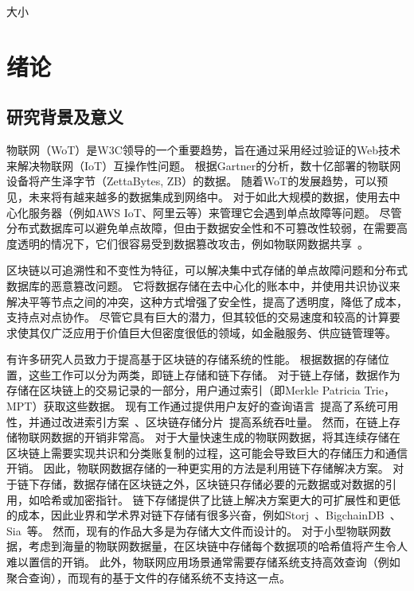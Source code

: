 
大小

\chapter{绪论}
\section{研究背景及意义}
物联网（WoT）是W3C领导的一个重要趋势，旨在通过采用经过验证的Web技术来解决物联网（IoT）互操作性问题。
根据Gartner的分析，数十亿部署的物联网设备将产生泽字节（ZettaBytes, ZB）的数据。
随着WoT的发展趋势，可以预见，未来将有越来越多的数据集成到网络中。
对于如此大规模的数据，使用去中心化服务器（例如AWS IoT、阿里云等）来管理它会遇到单点故障等问题。
尽管分布式数据库可以避免单点故障，但由于数据安全性和不可篡改性较弱，在需要高度透明的情况下，它们很容易受到数据篡改攻击，例如物联网数据共享~\cite{chen2022blockchain}。

区块链以可追溯性和不变性为特征，可以解决集中式存储的单点故障问题和分布式数据库的恶意篡改问题。
它将数据存储在去中心化的账本中，并使用共识协议来解决平等节点之间的冲突，这种方式增强了安全性，提高了透明度，降低了成本，支持点对点协作。
尽管它具有巨大的潜力，但其较低的交易速度和较高的计算要求使其仅广泛应用于价值巨大但密度很低的领域，如金融服务、供应链管理等。

有许多研究人员致力于提高基于区块链的存储系统的性能。
根据数据的存储位置，这些工作可以分为两类，即链上存储和链下存储。
对于链上存储，数据作为存储在区块链上的交易记录的一部分，用户通过索引（即Merkle Patricia Trie，MPT）获取这些数据。
现有工作通过提供用户友好的查询语言~\cite{zhu2019sebdb,xu2019vchain,wang2022vchain+}提高了系统可用性，并通过改进索引方案~\cite{li2023lvmt,zhang2024cole}、区块链存储分片~\cite{zamani2018rapidchain,hong2023gridb,el2019blockchaindb}提高系统吞吐量。
然而，在链上存储物联网数据的开销非常高。
对于大量快速生成的物联网数据，将其连续存储在区块链上需要实现共识和分类账复制的过程，这可能会导致巨大的存储压力和通信开销。
因此，物联网数据存储的一种更实用的方法是利用链下存储解决方案。
对于链下存储，数据存储在区块链之外，区块链只存储必要的元数据或对数据的引用，如哈希或加密指针。
链下存储提供了比链上解决方案更大的可扩展性和更低的成本，因此业界和学术界对链下存储有很多兴奋，例如Storj~\cite{storj2018storj}、BigchainDB~\cite{mcconaghy2016bigchaindb}、Sia~\cite{sia}等。
然而，现有的作品大多是为存储大文件而设计的。
对于小型物联网数据，考虑到海量的物联网数据量，在区块链中存储每个数据项的哈希值将产生令人难以置信的开销。
此外，物联网应用场景通常需要存储系统支持高效查询（例如聚合查询），而现有的基于文件的存储系统不支持这一点。

